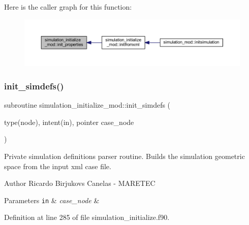Here is the caller graph for this function\+:\nopagebreak
\begin{figure}[H]
\begin{center}
\leavevmode
\includegraphics[width=350pt]{namespacesimulation__initialize__mod_a7b30af4cf1a6ee74a4b2c6e8c9d1d98d_icgraph}
\end{center}
\end{figure}
\mbox{\label{namespacesimulation__initialize__mod_ae4a495136e5f02724a5cc456d5884281}} 
\subsubsection{\texorpdfstring{init\+\_\+simdefs()}{init\_simdefs()}}
{\footnotesize\ttfamily subroutine simulation\+\_\+initialize\+\_\+mod\+::init\+\_\+simdefs (\begin{DoxyParamCaption}\item[{type(node), intent(in), pointer}]{case\+\_\+node }\end{DoxyParamCaption})\hspace{0.3cm}{\ttfamily [private]}}



Private simulation definitions parser routine. Builds the simulation geometric space from the input xml case file. 

\begin{DoxyAuthor}{Author}
Ricardo Birjukovs Canelas -\/ M\+A\+R\+E\+T\+EC 
\end{DoxyAuthor}

\begin{DoxyParams}[1]{Parameters}
\mbox{\tt in}  & {\em case\+\_\+node} & \\
\hline
\end{DoxyParams}


Definition at line 285 of file simulation\+\_\+initialize.\+f90.


